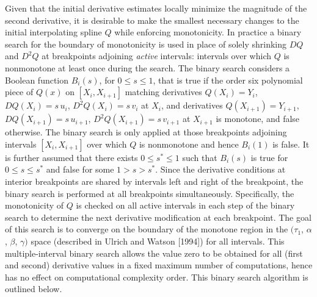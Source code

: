 Given that the initial derivative estimates locally minimize 
the magnitude of the second derivative, it is desirable to make
the smallest necessary changes to the initial interpolating spline $Q$
while enforcing monotonicity. In practice a binary search for the
boundary of monotonicity is used in place of solely shrinking $DQ$ and
$D^2Q$ at breakpoints adjoining {\it active\/} intervals: intervals
over which $Q$ is nonmonotone at least once during the search. The
binary search considers a Boolean function $B_i(s)$, for $0 \le s \le
1$, that is true if the order six polynomial piece of $Q(x)$ on
$[X_i, X_{i+1}]$ matching derivatives
$Q(X_i)=Y_i$, $DQ(X_i)=s \,u_i$, $D^2Q(X_i)=s \,v_i$ at $X_i$, and 
derivatives $Q(X_{i+1})=Y_{i+1}$, $DQ(X_{i+1})=s \,u_{i+1}$, 
$D^2Q(X_{i+1})=s \,v_{i+1}$ at $X_{i+1}$ is monotone, and false
otherwise.  The binary search is only applied at those breakpoints
adjoining intervals $[X_i, X_{i+1}]$ over which $Q$ is nonmonotone and
hence $B_i(1)$ is false.  It is further assumed that there exists
$0 \le s^* \le 1$ such that $B_i(s)$ is true for $0 \le s \le s^*$ and
false for some $1 > s > s^*$. Since the derivative conditions at
interior breakpoints are shared by intervals left and right of the
breakpoint, the binary search is performed at all breakpoints
simultaneously.  Specifically, the monotonicity of $Q$ is checked on
all active intervals in each step of the binary search to determine
the next derivative modification at each breakpoint. The goal of this
search is to converge on the boundary of the monotone region in the
$(\tau_1$, $\alpha$, $\beta$, $\gamma)$ space (described in Ulrich and
Watson [1994]) for all intervals. This multiple-interval binary search
allows the value zero to be obtained for all (first and second)
derivative values in a fixed maximum number of computations, hence has
no effect on computational complexity order. This binary search
algorithm is outlined below.


